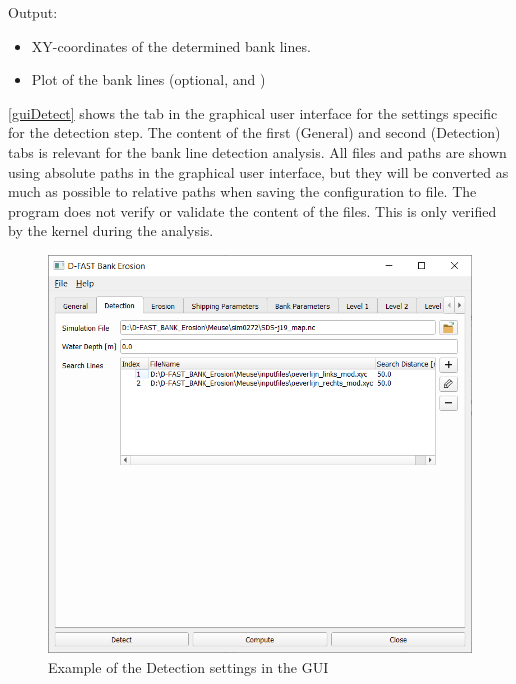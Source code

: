 Output:

\begin{itemize}
\item XY-coordinates of the determined bank lines.
\item Plot of the bank lines (optional,  and )
\end{itemize}

\autoref{guiDetect} shows the tab in the graphical user interface for the settings specific for the detection step.
The content of the first (General) and second (Detection) tabs is relevant for the bank line detection analysis.
All files and paths are shown using absolute paths in the graphical user interface, but they will be converted as much as possible to relative paths when saving the configuration to file.
The program does not verify or validate the content of the files.
This is only verified by the kernel during the analysis.

\begin{figure}[!b]
\center
\includegraphics[width=\textwidth]{figures/gui2.png}
\caption{Example of the Detection settings in the GUI}
\label{guiDetect}
\end{figure}


